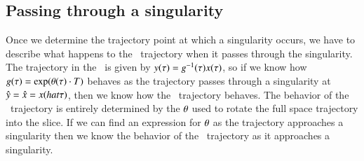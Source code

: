 


\subsection{Passing through a singularity}
\label{sect:passingSing}

Once we determine the trajectory point at which a singularity occurs,
we have to describe what happens to the \reducedsp\ trajectory
when it passes through the singularity.
The trajectory in the \reducedsp\ is given by
$y(\tau)=g^{-1}(\tau) x(\tau)$,
so if we know how $g(\tau)=\exp({{\bf \theta}(\tau) \cdot T})$
behaves as the trajectory passes through a singularity at
$\hat{y} =  \hat{x} = x(hat{\tau})$,
then we know how the \reducedsp\ trajectory behaves.
The behavior of the \reducedsp\ trajectory is entirely
determined by the ${\bf \theta}$ used to rotate the full space trajectory
into the slice. If we can find an expression for ${\bf \theta}$ as the trajectory approaches a singularity then we know the behavior of the \reducedsp\ trajectory as it approaches a singularity.

